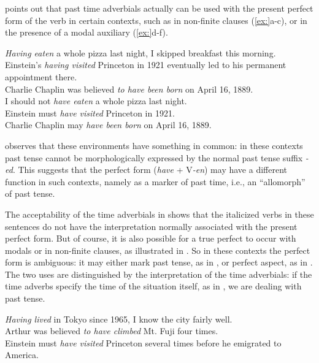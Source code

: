 \citet[55]{Comrie1976} points out that past time adverbials actually can be used with the present perfect form of the verb in certain contexts, such as in non-finite clauses (\ref{ex:}a-c), or in the presence of a modal auxiliary (\ref{ex:}d-f).


\ea
\ea \textit{Having eaten} a whole pizza last night, I skipped breakfast this morning.\\
\ex Einstein’s \textit{having visited} Princeton in 1921 eventually led to his permanent\\
  appointment there.\\
\ex Charlie Chaplin was believed \textit{to have been born} on April 16, 1889.\\
\ex I should not \textit{have eaten} a whole pizza last night.\\
\ex Einstein must \textit{have visited} Princeton in 1921.\\
\ex Charlie Chaplin may \textit{have been born} on April 16, 1889.
                       \z
\z


\citet[101]{McCawley1971} observes that these environments have something in common: in these contexts past tense cannot be morphologically expressed by the normal past tense suffix \textit{-ed}. This suggests that the perfect form (\textit{have} + V\textit{-en}) may have a different function in such contexts, namely as a marker of past time, i.e., an “allomorph” of past tense.



The acceptability of the time adverbials in  shows that the italicized verbs in these sentences do not have the interpretation normally associated with the present perfect form. But of course, it is also possible for a true perfect to occur with modals or in non-finite clauses, as illustrated in . So in these contexts the perfect form is ambiguous: it may either mark past tense, as in , or perfect aspect, as in . The two uses are distinguished by the interpretation of the time adverbials: if the time adverbs specify the time of the situation itself, as in , we are dealing with past tense.


\ea
\ea \textit{Having lived} in Tokyo since 1965, I know the city fairly well.\\
\ex Arthur was believed \textit{to have climbed} Mt. Fuji four times.\\
\ex Einstein must \textit{have visited} Princeton several times before he emigrated to America.
                       \z
\z


